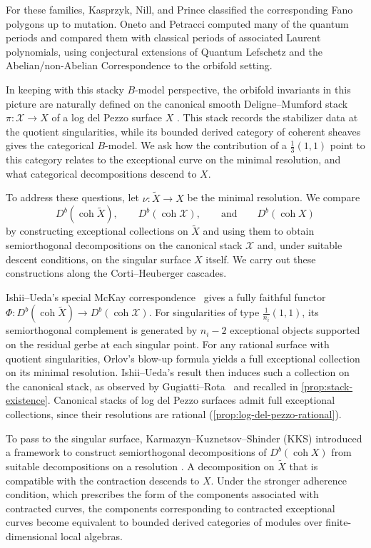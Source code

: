 \documentclass[11pt]{article}
\theoremstyle{plain}
\theoremstyle{definition}
\theoremstyle{remark}
\begin{document}
For these families, Kasprzyk, Nill, and Prince
\cite{KasprzykNillPrince2017} classified the corresponding Fano polygons
up to mutation. Oneto and Petracci \cite{OnetoPetracci2018} computed many
of the quantum periods and compared them with classical periods of
associated Laurent polynomials, using conjectural extensions of Quantum
Lefschetz and the Abelian/non-Abelian Correspondence to the orbifold
setting.

In keeping with this stacky $B$-model perspective, the orbifold invariants
in this picture are naturally defined on the canonical smooth
Deligne--Mumford stack $\pi\colon\mathcal X\to X$ of a log del Pezzo
surface $X$ \cite{AkhtarEtAl2016,OnetoPetracci2018}.
This stack records the stabilizer data at the quotient singularities,
while its bounded derived category of coherent sheaves gives the
categorical $B$-model. We ask how the contribution of a $\tfrac13(1,1)$
point to this category relates to the exceptional curve on the minimal
resolution, and what categorical decompositions descend to $X$.

To address these questions, let $\nu\colon\widetilde X\to X$ be the
minimal resolution. We compare
\[
D^b(\operatorname{coh}\widetilde X),\qquad
D^b(\operatorname{coh}\mathcal X),\qquad \text{and}\qquad
D^b(\operatorname{coh}X)
\]
by constructing exceptional collections on $\widetilde X$ and
using them to obtain semiorthogonal decompositions on the canonical stack
$\mathcal X$ and, under suitable descent conditions, on the singular
surface $X$ itself. We carry out these
constructions along the Corti--Heuberger cascades.

Ishii--Ueda's special McKay correspondence~\cite{Ishii2015} gives a fully faithful functor $\Phi\colon D^b(\operatorname{coh}\widetilde X)\to D^b(\operatorname{coh}\mathcal X)$. For singularities of type $\tfrac1{n_i}(1,1)$, its semiorthogonal complement is generated by $n_i-2$ exceptional objects supported on the residual gerbe at each singular point. For any rational surface with quotient singularities, Orlov's blow-up formula yields a full exceptional collection on its minimal resolution. Ishii--Ueda's result then induces such a collection on the canonical stack, as observed by Gugiatti--Rota~\cite[Remark~4.8]{GugiattiRota2023} and recalled in \cref{prop:stack-existence}. Canonical stacks of log del Pezzo surfaces admit full exceptional collections, since their resolutions are rational (\cref{prop:log-del-pezzo-rational}).

To pass to the singular surface, Karmazyn--Kuznetsov--Shinder (KKS) introduced a framework to construct semiorthogonal decompositions of $D^b(\operatorname{coh}X)$ from suitable decompositions on a resolution \cite[Theorems~2.12 and~3.16]{KKS2020}. A decomposition on $\widetilde X$ that is compatible with the contraction descends to $X$. Under the stronger adherence condition, which prescribes the form of the components associated with contracted curves, the components corresponding to contracted exceptional curves become equivalent to bounded derived categories of modules over finite-dimensional local algebras.
\end{document}
